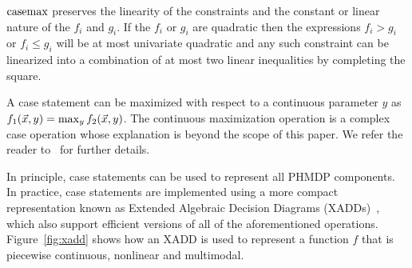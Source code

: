 $\mathrm{casemax}$ preserves the linearity of the constraints and the constant or linear nature of the {\footnotesize$f_i$} and {\footnotesize$g_i$}. If the {\footnotesize$f_i$} or {\footnotesize$g_i$} are quadratic then the expressions {\footnotesize$f_i > g_i$} or {\footnotesize$f_i \leq g_i$} will be at most univariate quadratic and any such constraint can be linearized into a combination of at most two linear inequalities by completing the square. 

A case statement can be maximized with respect to a continuous parameter {\footnotesize$y$} as {\footnotesize $ f_1(\vec{x}, y) = \contmax_{y}f_2(\vec{x}, y) $}. The continuous maximization operation is a complex case operation whose explanation is beyond the scope of this paper. We refer the reader to~\parencite{Zamani_AAAI_2012} for further details.

In principle, case statements can be used to represent all PHMDP components. In practice, case statements are implemented using a more compact representation known as Extended Algebraic Decision Diagrams (XADDs)~\parencite{Sanner_UAI_2011}, which also support efficient versions of all of the aforementioned operations. Figure~\ref{fig:xadd} shows how an XADD is used to represent a function {\footnotesize $f$} that is piecewise continuous, nonlinear and multimodal.

